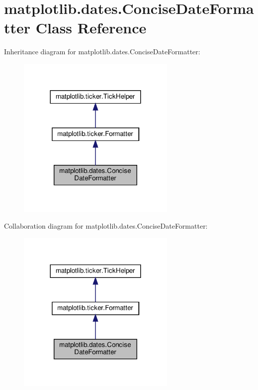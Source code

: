 \hypertarget{classmatplotlib_1_1dates_1_1ConciseDateFormatter}{}\section{matplotlib.\+dates.\+Concise\+Date\+Formatter Class Reference}
\label{classmatplotlib_1_1dates_1_1ConciseDateFormatter}


Inheritance diagram for matplotlib.\+dates.\+Concise\+Date\+Formatter\+:
\nopagebreak
\begin{figure}[H]
\begin{center}
\leavevmode
\includegraphics[width=216pt]{classmatplotlib_1_1dates_1_1ConciseDateFormatter__inherit__graph}
\end{center}
\end{figure}


Collaboration diagram for matplotlib.\+dates.\+Concise\+Date\+Formatter\+:
\nopagebreak
\begin{figure}[H]
\begin{center}
\leavevmode
\includegraphics[width=216pt]{classmatplotlib_1_1dates_1_1ConciseDateFormatter__coll__graph}
\end{center}
\end{figure}
